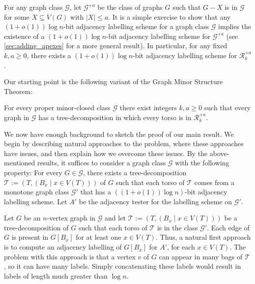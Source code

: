 \documentclass{patmorin}
\renewcommand{\ge}{\geqslant}
\renewcommand{\geq}{\geqslant}
\renewcommand{\leq}{\leqslant}
\newcommand{\vida}[1]{\noindent{\color{pink} VD: #1}}
\newcommand{\cyril}[1]{\noindent\textcolor{Green}{CG: #1}}
\newcommand{\defin}[1]{\emph{\textcolor{brightmaroon}{#1}}}
\newcommand{\calG}{\mathcal{G}}
\newcommand{\calR}{\mathcal{R}}
\newcommand{\calT}{\mathcal{T}}
\begin{document}
For any graph class $\calG$, let \defin{$\calG^{+a}$} be the class of graphs $G$ such that $G-X$ is in $\calG$ for some $X\subseteq V(G)$ with $|X|\leq a$.  It is a simple exercise to show that any $(1+o(1))\log n$-bit adjacency labelling scheme for a graph class $\calG$ implies the existence of a $(1+o(1))\log n$-bit adjacency labelling scheme for $\calG^{+a}$ (see \cref{sec:adding_apexes} for a more general result).  In particular, for any fixed $k,a\ge 0$, there exists a $(1+o(1))\log n$-bit adjacency labelling scheme for $\calR_k^{+a}$. 

Our starting point is the following variant of the Graph Minor Structure Theorem:

\begin{thm}
  \label{gmpst}
  For every proper minor-closed class $\calG$ there exist integers $k,a\geq 0$ such that every graph in $\calG$ has a tree-decomposition in which every torso is in $\calR_k^{+a}$.
\end{thm}

We now have enough background to sketch the proof of our main result.  We begin by describing natural approaches to the problem, where these approaches have issues, and then explain how we overcome these issues. By the above-mentioned results, it suffices to consider a graph class $\calG$ with the following property:
For every $G\in\calG$, there exists a tree-decomposition $\calT:=(T,(B_x\mid x\in V(T)))$ of $G$ such that each torso of $\calT$ comes from a monotone graph class $\calG'$ that has a $((1+o(1))\log n)$-bit adjacency labelling scheme.  Let $A'$ be the adjacency tester for the labelling scheme on $\calG'$. 

Let $G$ be an $n$-vertex graph in $\calG$ and let $\calT:=(T,(B_x\mid x\in V(T)))$ be a tree-decomposition of $G$ such that each torso of $\calT$ is in the class $\calG'$.  Each edge of $G$ is present in $G[B_x]$ for at least one $x\in V(T)$. Thus, a natural first approach is to compute an adjacency labelling of $G[B_x]$ for $A'$, for each $x\in V(T)$.  The problem with this approach is that a vertex $v$ of $G$ can appear in many bags of $\calT$, so it can have many labels. Simply concatenating these labels would result in labels of length much greater than $\log n$.
\end{document}
